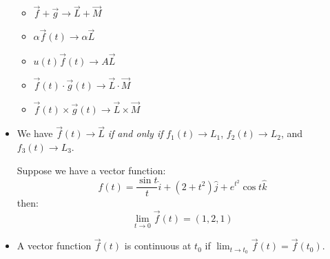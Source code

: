 \begin{itemize}
    \begin{itemize}
        \item $\vec{f}+\vec{g} \to \vec{L}+\vec{M}$
        \item $\alpha \vec{f}(t) \to \alpha \vec{L}$
        \item $u(t)\vec{f}(t) \to A\vec{L}$
        \item $\vec{f}(t)\cdot \vec{g}(t) \to \vec{L}\cdot \vec{M}$
        \item $\vec{f}(t) \times \vec{g}(t) \to \vec{L} \times \vec{M}$
    \end{itemize}
    \item We have $\vec{f}(t) \to \vec{L}$ \textit{if and only if} $f_1(t) \to L_1$, $f_2(t) \to L_2$, and $f_3(t) \to L_3$.
    \begin{example}
        Suppose we have a vector function:
        \begin{equation}
            f(t) = \frac{\sin t}{t} \hat{i} + (2+t^2)\hat{j} + e^{t^2}\cos t\hat{k}
        \end{equation}
        then:
        \begin{equation}
            \lim_{t\to 0} \vec{f}(t) = (1,2,1)
        \end{equation}
    \end{example}
    \item A vector function $\vec{f}(t)$ is continuous at $t_0$ if $\lim_{t\to t_0} \vec{f}(t) =\vec{f}(t_0)$.
\end{itemize}